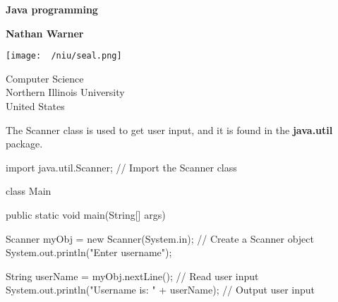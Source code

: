 \documentclass{report}
\title{\Huge{}}
\author{\huge{Nathan Warner}}
\date{\huge{}}
\begin{document}
        \begin{titlepage}
       \begin{center}
           \vspace*{1cm}
    
           \textbf{Java programming}
    
           \vspace{0.5cm}
            
                
           \vspace{1.5cm}
    
           \textbf{Nathan Warner}
    
           \vfill
                
                
           \vspace{0.8cm}
         
           \texttt{[image: ~/niu/seal.png]}
                
           Computer Science \\
           Northern Illinois University\\
           United States\\
           
                
       \end{center}
    \end{titlepage}
    \tableofcontents
    \pagebreak 
    \bigbreak \noindent 
    The Scanner class is used to get user input, and it is found in the \textbf{java.util} package.
    \bigbreak \noindent 
    \begin{javacode}
        import java.util.Scanner;  // Import the Scanner class

        class Main {
            public static void main(String[] args) {
                Scanner myObj = new Scanner(System.in);  // Create a Scanner object
                System.out.println("Enter username");

                String userName = myObj.nextLine();  // Read user input
                System.out.println("Username is: " + userName);  // Output user input
            }
        }
    \end{javacode}

    \bigbreak \noindent 
\end{document}
